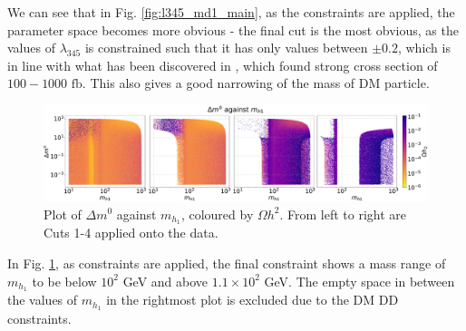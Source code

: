 \documentclass[12pt]{article}
\begin{document}
We can see that in Fig. \ref{fig:l345_md1_main}, as the constraints are applied, the parameter space becomes more obvious - the final cut is the most obvious, as the values of $\lambda_{345}$ is constrained such that it has only values between $\pm 0.2$, which is in line with what has been discovered in \cite{Belyaev:2018ext}, which found strong cross section of $100 - 1000 \text{ fb}$. This also gives a good narrowing of the mass of DM particle.

\begin{figure}[ht]
    \centering
    \includegraphics[width=\linewidth]{4plot/DM2_MD1.pdf}
    \caption{Plot of $\Delta m^0$ against $m_{h_1}$, coloured by $\Omega h^2$. From left to right are Cuts 1-4 applied onto the data.}
    \label{fig:DM2_md1_main}
\end{figure}

In Fig. \ref{fig:DM2_md1_main}, as constraints are applied, the final constraint shows a mass range of $m_{h_1}$ to be below $10^2$ GeV and above $1.1\times10^2$ GeV. The empty space in between the values of $m_{h_1}$ in the rightmost plot is excluded due to the DM DD constraints.
\end{document}
